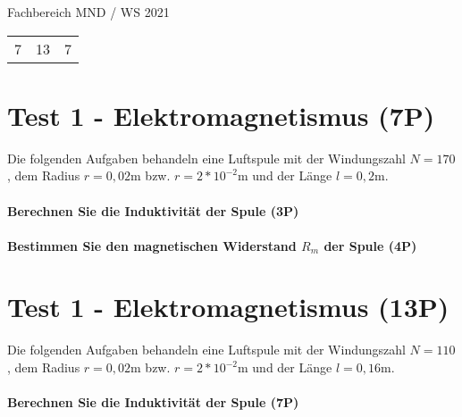 \documentclass{article}
\begin{document}
Fachbereich MND / WS 2021

\begin{table}[]
\begin{tabular}{ lll }
7 & 13 & 7
\end{tabular}
\end{table}


\part*{Test 1 - Elektromagnetismus (7P)}

Die folgenden Aufgaben behandeln eine Luftspule mit der Windungszahl $N=170$, dem Radius $r=0{,}02$m bzw. $r=2*10^{ -2 }$m und der Länge $l=0{,}2$m.

\subsection*{Berechnen Sie die Induktivität der Spule (3P)}


\vspace{\baselineskip}\vspace{\baselineskip}\vspace{\baselineskip}

\subsection*{Bestimmen Sie den magnetischen Widerstand $R_{m}$ der Spule (4P)}


\vspace{\baselineskip}



\part*{Test 1 - Elektromagnetismus (13P)}

Die folgenden Aufgaben behandeln eine Luftspule mit der Windungszahl $N=110$, dem Radius $r=0{,}02$m bzw. $r=2*10^{ -2 }$m und der Länge $l=0{,}16$m.

\subsection*{Berechnen Sie die Induktivität der Spule (7P)}


\vspace{\baselineskip}\vspace{\baselineskip}\vspace{\baselineskip}
\end{document}
